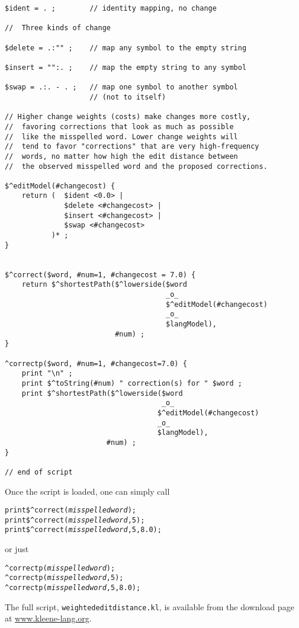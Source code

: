 \begin{Verbatim}
$ident = . ;        // identity mapping, no change

//	Three kinds of change

$delete = .:"" ;    // map any symbol to the empty string

$insert = "":. ;    // map the empty string to any symbol

$swap = .:. - . ;   // map one symbol to another symbol 
                    // (not to itself)

// Higher change weights (costs) make changes more costly,
//  favoring corrections that look as much as possible
//  like the misspelled word. Lower change weights will
//  tend to favor "corrections" that are very high-frequency
//  words, no matter how high the edit distance between
//  the observed misspelled word and the proposed corrections.

$^editModel(#changecost) {
    return (  $ident <0.0> | 
              $delete <#changecost> | 
              $insert <#changecost> |
              $swap <#changecost>
           )* ;
}


$^correct($word, #num=1, #changecost = 7.0) {
    return $^shortestPath($^lowerside($word 
                                      _o_ 
                                      $^editModel(#changecost) 
                                      _o_
                                      $langModel), 
                          #num) ;
}

^correctp($word, #num=1, #changecost=7.0) {
    print "\n" ;
    print $^toString(#num) " correction(s) for " $word ;
    print $^shortestPath($^lowerside($word 
                                     _o_ 
                                    $^editModel(#changecost)
                                    _o_
                                    $langModel), 
                        #num) ;
}

// end of script
\end{Verbatim}

Once the script is loaded, one can simply call

\begin{alltt}
	print \verb!$^correct!(\emph{misspelledword}) ;
	print \verb!$^correct!(\emph{misspelledword}, 5) ;
	print \verb!$^correct!(\emph{misspelledword}, 5, 8.0) ;
\end{alltt}

\noindent
or just

\begin{alltt}
	\verb!^correctp!(\emph{misspelledword}) ;
	\verb!^correctp!(\emph{misspelledword}, 5) ;
	\verb!^correctp!(\emph{misspelledword}, 5, 8.0) ;
\end{alltt}

\noindent
The full script, \verb!weightededitdistance.kl!, is available from the
download page at \url{www.kleene-lang.org}.
